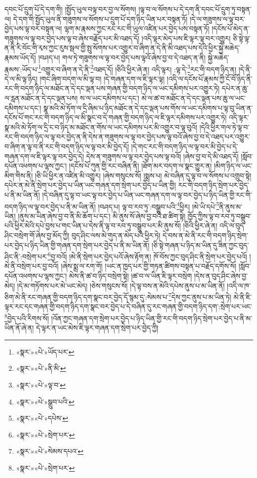 དབང་པོ་དྲུག་པོ་དེ་དག་གི། །སྤྱོད་ཡུལ་བལྟ་བར་བྱ་ལ་སོགས། །ལྟ་བ་ལ་སོགས་པ་དེ་དག་ནི་དབང་པོ་དྲུག་ཏུ་བསྟན་ལ། དེ་དག་གི་སྤྱོད་ཡུལ་ནི་གཟུགས་ལ་སོགས་པ་དྲུག་པོ་དག་ཉིད་ཡིན་པར་བསྟན་ཏོ། །དེ་ལ་གཟུགས་ལ་ལྟ་བར་བྱེད་པས་ལྟ་བར་བསྟན་ལ། ལྷག་མ་རྣམས་ཀྱང་རང་རང་གི་ཡུལ་འཛིན་པར་བྱེད་པས་བསྟན་ཏོ། །དངོས་པོ་མེད་ན་གཟུགས་ལ་ལྟ་བར་བྱེད་པས་ལྟ་བ་ཞེས་བརྗོད་པར་མི་འཐད་དོ། །འདི་ལྟར་མེད་པས་ཇི་ལྟར་ལྟ་བར་འགྱུར། ཅི་སྟེ་ལྟ་ན་ནི་རི་བོང་གི་རྭས་ཀྱང་རུས་སྦལ་གྱི་སྤུ་སོགས་པར་འགྱུར་བ་ཞིག་ན་དེ་ནི་མི་འཐད་པས་དེའི་ཕྱིར་སྐྱེ་མཆེད་རྣམས་ཡོད་དོ། །བཤད་པ། གལ་ཏེ་གཟུགས་ལ་ལྟ་བར་བྱེད་པས་ལྟའོ་ཞེས་བྱ་བ་དེ་འཐད་ན་ནི། སྐྱེ་མཆེད་རྣམས་:ཡོད་པ་\footnote{«སྣར་»«པེ་»ཡོད་པར་}འགྱུར་བ་ཞིག་ན་དེ་ནི་\footnote{«སྣར་»«པེ་»ནི་མི་}འཐད་དོ། །ཅིའི་ཕྱིར་ཞེ་ན། འདི་ལྟར། :ལྟ་དེ་\footnote{«སྣར་»«པེ་»ལྟ་བ་}རང་གི་བདག་ཉིད་ན། །དེ་ནི་དེ་ལ་མི་ལྟ་ཉིད། །གང་ཞིག་བདག་ལ་མི་ལྟ་བ། །དེ་གཞན་དག་ལ་ཇི་ལྟར་ལྟ། །འདི་ལ་དངོས་པོ་རྣམས་ཀྱི་ངོ་བོ་ཉིད་ནི་རང་གི་བདག་ཉིད་ལ་མཐོང་ན་དེ་དང་ལྡན་པས་གཞན་གྱི་བདག་ཉིད་ལ་ཡང་དམིགས་པར་འགྱུར་ཏེ། དཔེར་ན་ཆུ་ལ་རླན་མཐོང་ན་དེ་དང་ལྡན་པས། ས་ལ་ཡང་དམིགས་པ་དང་། མེ་ལ་ཚ་བ་མཐོང་ན་དེ་དང་ལྡན་པས་ཆུ་ལ་ཡང་དམིགས་པ་དང་། སྣ་མའི་མེ་ཏོག་ལ་དྲི་ཞིམ་པ་ཉིད་མཐོང་ན་དེ་དང་ལྡན་པས་གོས་ལ་ཡང་དམིགས་པ་ལྟ་བུ་ཡིན་ན་དངོས་པོ་གང་རང་གི་བདག་ཉིད་ལ་མི་སྣང་བ་དེ་གཞན་གྱི་བདག་ཉིད་ལ་ཇི་ལྟར་དམིགས་པར་འགྱུར་ཏེ། འདི་ལྟར་སྣ་མའི་མེ་ཏོག་ལ་དྲི་ང་བ་ཉིད་མ་མཐོང་ན་གོས་ལ་ཡང་དམིགས་པར་མི་འགྱུར་བ་ལྟ་བུའོ། །དེའི་ཕྱིར་གལ་ཏེ་ལྟ་བ་རང་གི་བདག་ཉིད་ལ་ལྟ་བར་བྱེད་ན་ནི་དེས་ན་གཟུགས་ལ་ལྟ་བར་བྱེད་པས་ལྟ་བའོ་ཞེས་བྱ་བ་དེ་འཐད་པར་འགྱུར་བ་ཞིག་ན་ལྟ་བ་ནི་རང་གི་བདག་ཉིད་ལ་ལྟ་བར་མི་བྱེད་དོ། །དེ་གང་རང་གི་བདག་ཉིད་ལ་ལྟ་བར་མི་བྱེད་པ་དེ་གཞན་དག་ལ་ཇི་ལྟར་ལྟ་བར་བྱེད་དེ། དེས་ན་གཟུགས་ལ་ལྟ་བར་བྱེད་པས་ལྟ་བའོ། །ཞེས་བྱ་བ་དེ་མི་འཐད་དོ། །སློབ་དཔོན་འཕགས་པ་ལྷས་ཀྱང་། །དངོས་པོ་ཀུན་གྱི་རང་བཞིན་ནི། །ཐོག་མར་བདག་ལ་སྣང་གྱུར་ན། །མིག་ཉིད་ལ་ཡང་མིག་གིས་ནི། །ཅི་ཡི་ཕྱིར་ན་འཛིན་མི་འགྱུར། །ཞེས་གསུངས་སོ། །སྨྲས་པ། མེ་བཞིན་དུ་ལྟ་བ་ལ་སོགས་པ་འགྲུབ་སྟེ། དཔེར་ན་མེ་ནི་སྲེག་པར་བྱེད་པ་ཡིན་ཡང་གཞན་དག་སྲེག་པར་བྱེད་པ་ཡིན་གྱི། རང་གི་བདག་ཉིད་སྲེག་པར་བྱེད་པ་ནི་མ་ཡིན་ནོ། །དེ་བཞིན་དུ་ལྟ་བ་ཡང་ལྟ་བར་བྱེད་པ་ཡིན་ཡང་གཞན་དག་ལ་ལྟ་བར་བྱེད་པ་ཉིད་ཡིན་གྱི་རང་གི་བདག་ཉིད་ལ་ལྟ་བར་བྱེད་པ་ནི་མ་ཡིན་ནོ། །བཤད་པ། ལྟ་བ་རབ་ཏུ་:བསྒྲུབ་པའི་\footnote{«སྣར་»«པེ་»སྒྲུབ་པའི་}ཕྱིར། །མེ་ཡི་དཔེ་\footnote{«སྣར་»«པེ་»དཔེས་}ནི་ནུས་མ་ཡིན། །ནུས་མ་ཡིན་ཞེས་བྱ་བ་ནི་མི་ཆོག་པ་དང་། མི་ནུས་སོ་ཞེས་བྱ་བའི་ཐ་ཚིག་སྟེ། ཁྱོད་ཀྱིས་ལྟ་བ་རབ་ཏུ་བསྒྲུབ་པའི་ཕྱིར་མེའི་དཔེ་བྱས་པ་གང་ཡིན་པ་དེས་ནི་ལྟ་བ་རབ་ཏུ་བསྒྲུབ་པར་མི་ནུས་སོ། །ཅིའི་ཕྱིར་ཞེ་ན། འདི་ལ་བུད་ཤིང་བསྲེག་གོ་ཞེས་བྱ་མོད་ཀྱི། བུད་ཤིང་ལས་མེ་གུད་ན་མེད་པའི་ཕྱིར་ཏེ། དེ་བས་ན་མེ་ནི་རང་གི་བདག་ཉིད་སྲེག་པར་བྱེད་པ་ཉིད་ཡིན་གྱི་གཞན་དག་སྲེག་པར་བྱེད་པ་ནི་མ་ཡིན་ནོ། །ཅི་སྟེ་གཞན་པ་ཉིད་མ་ཡིན་དུ་ཟིན་ཀྱང་བུད་ཤིང་ནི་:བསྲེག་པར་\footnote{«སྣར་»«པེ་»སྲེག་པར་}བྱ་བའོ། །མེ་ནི་སྲེག་པར་བྱེད་པའོ་ཞེས་རྟོག་ན། ཁོ་བོས་ཀྱང་བུད་ཤིང་ནི་སྲེག་པར་བྱེད་པའོ། །མེ་ནི་བསྲེག་པར་བྱ་བའོ། །ཞེས་སྨྲ་ལ་རག་གོ། །ཡང་ན་ཁྱད་པར་གྱི་གཏན་ཚིགས་བསྟན་པ་བརྗོད་དགོས་སོ། །སློབ་དཔོན་འཕགས་པ་ལྷས་ཀྱང་། མེས་ནི་ཚ་བ་ཉིད་བསྲེག་སྟེ། །ཚ་བ་ལ་ཡིན་ཇི་ལྟར་བསྲེག །དེས་ན་བུད་ཤིང་ཞེས་བྱ་མེད། །དེ་མ་གཏོགས་པར་མེ་ཡང་མེད། །ཅེས་གསུངས་སོ། །དེ་ལྟ་བས་ན་མེའི་དཔེས་ནུས་པ་མ་ཡིན་ནོ། །འདི་ལ་ཁ་ཅིག་མེ་ནི་རང་གཞན་གྱི་བདག་ཉིད་དག་སྣང་བར་བྱེད་དོ་སྙམ་དུ་:སེམས་པ་\footnote{«སྣར་»«པེ་»སེམས་དཔའ་}དེས་ཀྱང་ནུས་པ་མ་ཡིན་ཏེ། མེ་ནི་ཇི་ལྟར་རང་དང་གཞན་གྱི་བདག་ཉིད་དག་སྣང་བར་བྱེད་པ་དེ་བཞིན་དུ་རང་གཞན་གྱི་བདག་ཉིད་དག་:སྲེག་པར་ཡང་\footnote{«སྣར་»«པེ་»སྲེག་པར་}བྱེད་པའི་རིགས་སོ། །འོན་ཀྱང་གཞན་དག་སྲེག་པར་བྱེད་པ་ཉིད་ཡིན་གྱི་རང་གི་བདག་ཉིད་སྲེག་པར་བྱེད་པ་ནི་མ་ཡིན་ནོ་ཞེ་ན། དེ་ལྟར་ན་ཡང་མེས་ཇི་ལྟར་གཞན་དག་སྲེག་པར་བྱེད་ཀྱི། 